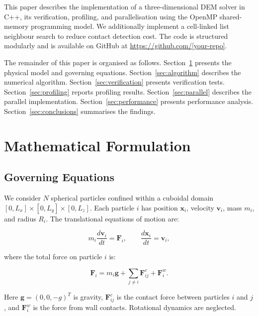 \documentclass[conference]{IEEEtran}
\begin{document}
	This paper describes the implementation of a three-dimensional DEM solver in
	C++, its verification, profiling, and parallelisation using the OpenMP shared-memory
	programming model. We additionally implement a cell-linked list neighbour search
	to reduce contact detection cost. The code is structured modularly and is
	available on GitHub at \url{https://github.com/[your-repo]}.
	
	The remainder of this paper is organised as follows. Section~\ref{sec:model}
	presents the physical model and governing equations.
	Section~\ref{sec:algorithm} describes the numerical algorithm.
	Section~\ref{sec:verification} presents verification tests.
	Section~\ref{sec:profiling} reports profiling results.
	Section~\ref{sec:parallel} describes the parallel implementation.
	Section~\ref{sec:performance} presents performance analysis.
	Section~\ref{sec:conclusions} summarises the findings.
	
	\section{Mathematical Formulation}
	\label{sec:model}
	
	\subsection{Governing Equations}
	
	We consider $N$ spherical particles confined within a cuboidal domain
	$[0, L_x] \times [0, L_y] \times [0, L_z]$. Each particle $i$ has position
	$\mathbf{x}_i$, velocity $\mathbf{v}_i$, mass $m_i$, and radius $R_i$. The
	translational equations of motion are:
	
	\begin{equation}
		m_i \frac{d\mathbf{v}_i}{dt} = \mathbf{F}_i,
		\qquad
		\frac{d\mathbf{x}_i}{dt} = \mathbf{v}_i,
	\end{equation}
	
	where the total force on particle $i$ is:
	
	\begin{equation}
		\mathbf{F}_i = m_i \mathbf{g}
		+ \sum_{j \neq i} \mathbf{F}^c_{ij}
		+ \mathbf{F}^w_i.
	\end{equation}
	
	Here $\mathbf{g} = (0, 0, -g)^T$ is gravity, $\mathbf{F}^c_{ij}$ is the
	contact force between particles $i$ and $j$, and $\mathbf{F}^w_i$ is the
	force from wall contacts. Rotational dynamics are neglected.
	
\end{document}
